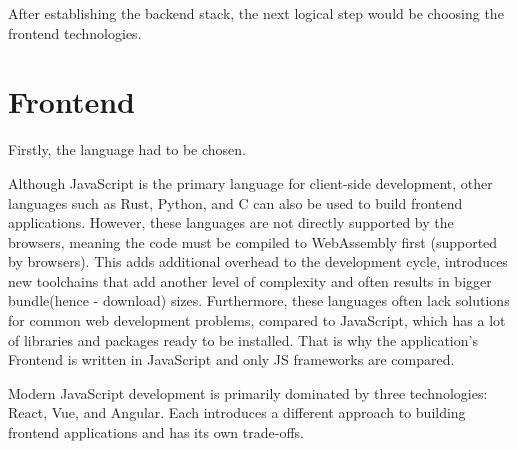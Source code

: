 After establishing the backend stack, the next logical step would be choosing the frontend technologies.


\section{Frontend}
Firstly, the language had to be chosen.

Although JavaScript is the primary language for client-side development,
other languages such as Rust, Python, and C can also be used to build frontend applications.
However, these languages are not directly supported by the browsers, meaning the code must be compiled to WebAssembly first (supported by browsers). This adds
additional overhead to the development cycle, introduces new toolchains that add another level of
complexity and often results in bigger bundle(hence - download) sizes.
Furthermore, these languages often lack solutions for common web development problems,
compared to JavaScript, which has a lot of libraries and packages ready to be installed.
That is why the application's Frontend is written in JavaScript and only JS frameworks are
compared.

Modern JavaScript development is primarily dominated by three technologies: React, Vue, and Angular.\cite{frameworkdata}
Each introduces a different approach to building frontend applications and has its own trade-offs.

